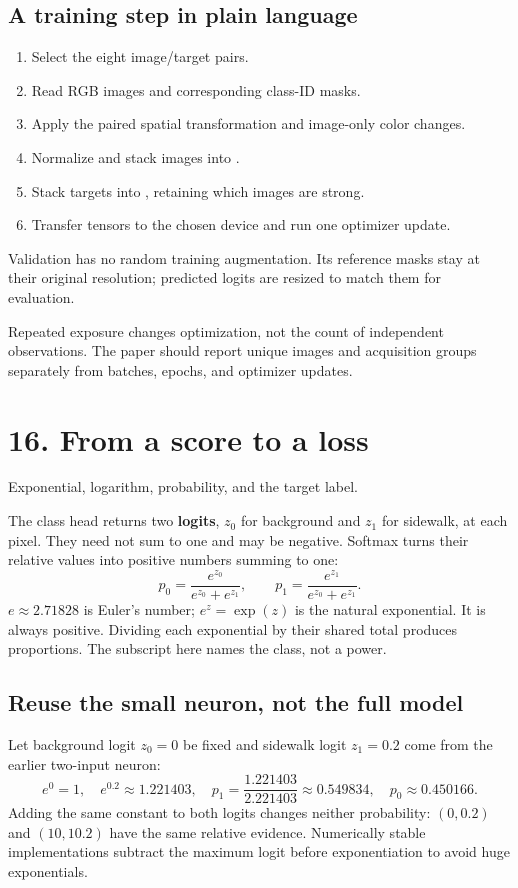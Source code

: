 \documentclass[11pt,letterpaper]{article}
\newcommand{\code}[1]{\texttt{\detokenize{#1}}}
\newcommand{\note}[1]{\par\vspace{3pt}\begingroup\setlength{\fboxsep}{8pt}%
 \colorbox{pale}{\parbox{\dimexpr\linewidth-2\fboxsep\relax}{#1}}\endgroup\par\vspace{3pt}}
\newcommand{\guidepage}[2]{\clearpage\pdfbookmark[0]{#1}{guide-\thepage}\section*{#1}{\sffamily\color{muted}#2}\par\vspace{5pt}}
\begin{document}
\subsection*{A training step in plain language}
\begin{enumerate}
\item Select the eight image/target pairs.
\item Read RGB images and corresponding class-ID masks.
\item Apply the paired spatial transformation and image-only color changes.
\item Normalize and stack images into \code{[8, 3, 540, 960]}.
\item Stack targets into \code{[8, 540, 960]}, retaining which images are strong.
\item Transfer tensors to the chosen device and run one optimizer update.
\end{enumerate}

Validation has no random training augmentation. Its reference masks stay at their original resolution; predicted logits are resized to match them for evaluation.

\note{Repeated exposure changes optimization, not the count of independent observations. The paper should report unique images and acquisition groups separately from batches, epochs, and optimizer updates.}

\guidepage{16. From a score to a loss}{Exponential, logarithm, probability, and the target label.}
The class head returns two \textbf{logits}, $z_0$ for background and $z_1$ for sidewalk, at each pixel. They need not sum to one and may be negative. Softmax turns their relative values into positive numbers summing to one:
\[
p_0=\frac{e^{z_0}}{e^{z_0}+e^{z_1}},\qquad
p_1=\frac{e^{z_1}}{e^{z_0}+e^{z_1}}.
\]
$e\approx2.71828$ is Euler's number; $e^z=\exp(z)$ is the natural exponential. It is always positive. Dividing each exponential by their shared total produces proportions. The subscript here names the class, not a power.

\subsection*{Reuse the small neuron, not the full model}
Let background logit $z_0=0$ be fixed and sidewalk logit $z_1=0.2$ come from the earlier two-input neuron:
\[
e^0=1,\quad e^{0.2}\approx1.221403,\quad
p_1=\frac{1.221403}{2.221403}\approx0.549834,\quad p_0\approx0.450166.
\]
Adding the same constant to both logits changes neither probability: $(0,0.2)$ and $(10,10.2)$ have the same relative evidence. Numerically stable implementations subtract the maximum logit before exponentiation to avoid huge exponentials.
\end{document}
